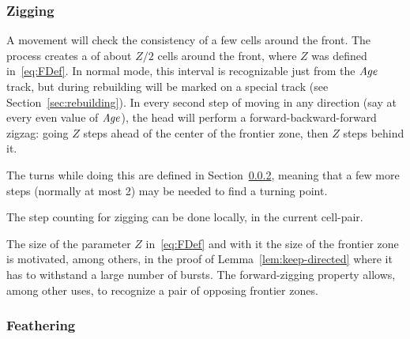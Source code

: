 \documentclass[11pt]{memoir}
\theoremstyle{definition} %
\newcommand{\fld}[1]{\ensuremath{\textit{#1\/}}}
\newcommand{\Z}{Z} %
\newcommand{\Age}{\fld{Age}} %
\begin{document}
\subsubsection{Zigging}\label{sec:zigging}

A  movement will check the consistency of a few cells around the front.
The process creates a  of about \( \Z/2 \) cells around the front,
where \( \Z \) was defined in~\eqref{eq:FDef}.
In normal mode, this interval is recognizable just from
the \( \Age \) track, but during rebuilding will be marked on a special track
(see Section~\ref{sec:rebuilding}).
In every second step of moving in any direction (say at every even value of \( \Age \)),
the head will perform a forward-backward-forward
zigzag: going \( \Z \) steps ahead of the center of the frontier zone, then \( \Z \) steps behind it.

The turns while doing this are  defined in Section~\ref{sec:feathering},
meaning that a few more steps (normally at most 2) may be needed to find a turning point.

The step counting for zigging can be done locally, in the current cell-pair.
 
\begin{remark}\label{rem:zigging-choices}
  The size of the parameter \( \Z \) in~\eqref{eq:FDef}
  and with it the size of the frontier zone
  is motivated, among others, in the proof of Lemma~\ref{lem:keep-directed} where
  it has to withstand a large number of bursts.
  The forward-zigging property  allows, among other uses, to recognize a pair of opposing
  frontier zones.
\end{remark}

\subsubsection{Feathering}\label{sec:feathering}
\end{document}
